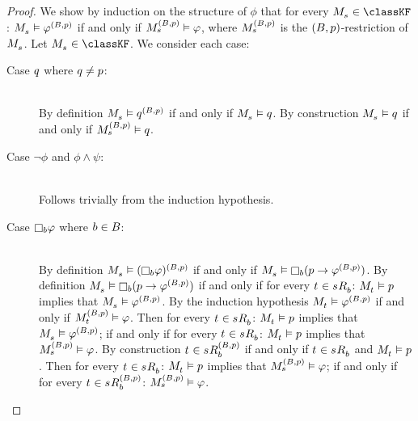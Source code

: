 \begin{proof}
We show by induction on the structure of $\phi$ that for every $\kPModel{\kStateS} \in \classKF$: $\kPModel{\kStateS} \entails \phi^{(\agentsB, \atomP)}$ if and only if $\kPModel[(\agentsB, \atomP)]{\kStateS} \entails \phi$, where $\kPModel[(\agentsB, \atomP)]{\kStateS}$ is the $(B, p)$-restriction of $\kPModel{\kStateS}$.
Let $\kPModel{\kStateS} \in \classKF$.
We consider each case:
\begin{description}
    \item[Case $q$ where $q \neq p$:] \hfill\\
        By definition $\kPModel{\kStateS} \entails \atomQ^{(\agentsB, \atomP)}$ if and only if $\kPModel{\kStateS} \entails \atomQ$.
        By construction $\kPModel{\kStateS} \entails \atomQ$ if and only if $\kPModel[(\agentsB, \atomP)]{\kStateS} \entails \atomQ$.
    \item[Case $\lnot \phi$ and $\phi \land \psi$:] \hfill\\
        Follows trivially from the induction hypothesis.
    \item[Case $\necessaryB \phi$ where $b \in B$:] \hfill\\
        By definition $\kPModel{\kStateS} \entails (\necessaryB \phi)^{(\agentsB, \atomP)}$ if and only if $\kPModel{\kStateS} \entails \necessaryB (\atomP \implies \phi^{(\agentsB, \atomP)})$.
        By definition $\kPModel{\kStateS} \entails \necessaryB (\atomP \implies \phi^{(\agentsB, \atomP)})$ if and only if for every $\kStateT \in \kSuccessorsB{\kStateS}$: $\kPModel{\kStateT} \entails \atomP$ implies that  $\kPModel{\kStateS} \entails \phi^{(\agentsB, \atomP)}$.
        By the induction hypothesis $\kPModel{\kStateT} \entails \phi^{(\agentsB, \atomP)}$ if and only if $\kPModel[(\agentsB, \atomP)]{\kStateT} \entails \phi$.
        Then for every $\kStateT \in \kSuccessorsB{\kStateS}$: $\kPModel{\kStateT} \entails \atomP$ implies that  $\kPModel{\kStateS} \entails \phi^{(\agentsB, \atomP)}$; if and only if for every $\kStateT \in \kSuccessorsB{\kStateS}$: $\kPModel{\kStateT} \entails \atomP$ implies that $\kPModel[(\agentsB, \atomP)]{\kStateS} \entails \phi$.
        By construction $\kStateT \in \kSuccessorsB[(\agentsB, \atomP)]{\kStateS}$ if and only if $\kStateT \in \kSuccessorsB{\kStateS}$ and $\kPModel{\kStateT} \entails \atomP$.
        Then for every $\kStateT \in \kSuccessorsB{\kStateS}$: $\kPModel{\kStateT} \entails \atomP$ implies that $\kPModel[(\agentsB, \atomP)]{\kStateS} \entails \phi$; if and only if for every $\kStateT \in \kSuccessorsB[(\agentsB, \atomP)]{\kStateS}$: $\kPModel[(\agentsB, \atomP)]{\kStateS} \entails \phi$.

\end{description}
\end{proof}
